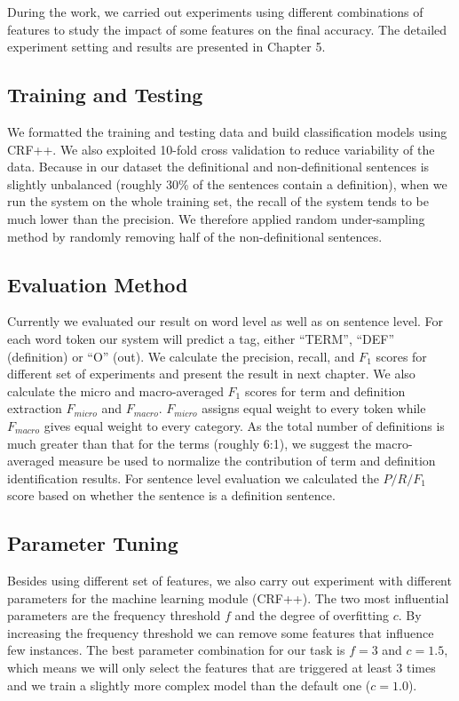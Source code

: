 \documentclass[hyp]{socreport}
\begin{document}
During the work, we carried out experiments using different combinations of features to study the impact of some features on the final accuracy. The detailed experiment setting and results are presented in Chapter 5. 

\subsection{Training and Testing}
We formatted the training and testing data and build classification models using CRF++. We also exploited 10-fold cross validation to reduce variability of the data. Because in our dataset the definitional and non-definitional sentences is slightly unbalanced (roughly 30\% of the sentences contain a definition), when we run the system on the whole training set, the recall of the system tends to be much lower than the precision. We therefore applied random under-sampling method by randomly removing half of the non-definitional sentences.    

\subsection{Evaluation Method}
Currently we evaluated our result on word level as well as on sentence level. For each word token our system will predict a tag, either ``TERM'', ``DEF'' (definition) or ``O'' (out). We calculate the precision, recall, and $F_1$ scores for different set of experiments and present the result in next chapter. We also calculate the micro and macro-averaged $F_1$ scores for term and definition extraction $F_{micro}$ and $F_{macro}$. $F_{micro}$ assigns equal weight to every token while $F_{macro}$ gives equal weight to every category. As the total number of definitions is much greater than that for the terms (roughly 6:1), we suggest the macro-averaged measure be used to normalize the contribution of term and definition identification results. For sentence level evaluation we calculated the $P/R/F_1$ score based on whether the sentence is a definition sentence.

\subsection{Parameter Tuning}

Besides using different set of features, we also carry out experiment with different parameters for the machine learning module (CRF++). The two most influential parameters are the frequency threshold $f$ and the degree of overfitting $c$. By increasing the frequency threshold we can remove some features that influence few instances. The best parameter combination for our task is $f=3$ and $c=1.5$, which means we will only select the features that are triggered at least 3 times and we train a slightly more complex model than the default one ($c=1.0$).
\end{document}
